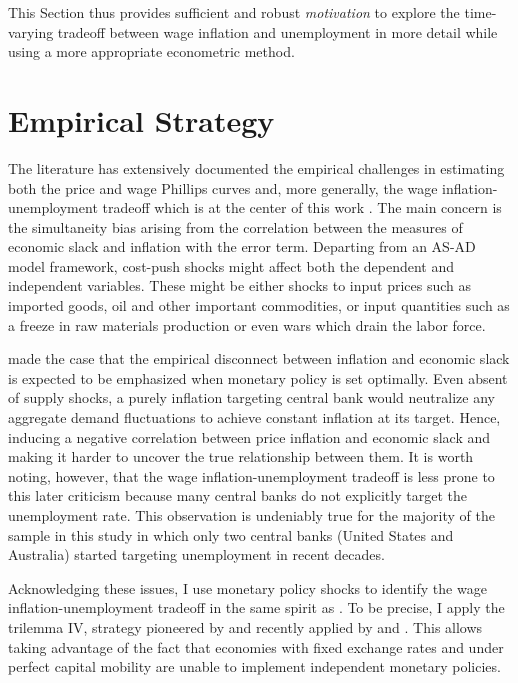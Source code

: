 \documentclass[12pt]{article}
\begin{document}
This Section thus provides sufficient and robust \textit{motivation} to explore the time-varying tradeoff between wage inflation and unemployment in more detail while using a more appropriate econometric method.


\section{Empirical Strategy \label{SS_Identification}}

The literature has extensively documented the empirical challenges in estimating both the price and wage Phillips curves \citep{Gali2011, Mavroeidis2014, Mcleay2019} and, more generally, the wage inflation-unemployment tradeoff which is at the center of this work \citep{Barnichon2019, Gali2019}. The main concern is the simultaneity bias arising from the correlation between the measures of economic slack and inflation with the error term. Departing from an AS-AD model framework, cost-push shocks might affect both the dependent and independent variables. These might be either shocks to input prices such as imported goods, oil and other important commodities, or input quantities such as a freeze in raw materials production or even wars which drain the labor force. 

\cite{Mcleay2019} made the case that the empirical disconnect between inflation and economic slack is expected to be emphasized when monetary policy is set optimally. Even absent of supply shocks, a purely inflation targeting central bank would neutralize any aggregate demand fluctuations to achieve constant inflation at its target. Hence, inducing a negative correlation between price inflation and economic slack and making it harder to uncover the true relationship between them. It is worth noting, however, that the wage inflation-unemployment tradeoff is less prone to this later criticism because many central banks do not explicitly target the unemployment rate. This observation is undeniably true for the majority of the sample in this study in which only two central banks (United States and Australia) started targeting unemployment in recent decades.
 
Acknowledging these issues, I use monetary policy shocks to identify the wage inflation-unemployment tradeoff in the same spirit as \cite{Jorda2018}. To be precise, I apply the trilemma IV, strategy pioneered by \cite{DiGiovanni2009} and recently applied by \cite{Jorda2019} and \cite{Schularick2020}. This allows taking advantage of the fact that economies with fixed exchange rates and under perfect capital mobility are unable to implement independent monetary policies. %
\end{document}
